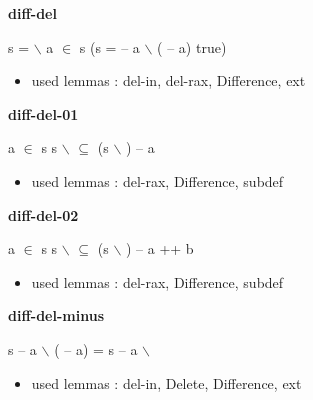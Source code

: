 \documentclass[a4paper]{article}
\begin{document}
{\large\bf diff-del}

\medskip

 \Fol s =  $\backslash$  \And \Not a $\in$ s \Imp (s =  -- a $\backslash$ ( -- a) \Equiv true)

\begin{itemize}


\item       used lemmas  : del-in, del-rax, Difference, ext

\end{itemize}

\medskip

\bigskip

{\large\bf diff-del-01}

\medskip

 \Fol \Not a $\in$ s \Imp s $\backslash$  $\subseteq$ (s $\backslash$ ) -- a

\begin{itemize}


\item       used lemmas  : del-rax, Difference, subdef

\end{itemize}

\medskip

\bigskip

{\large\bf diff-del-02}

\medskip

 \Fol \Not a $\in$ s \Imp s $\backslash$  $\subseteq$ (s $\backslash$ ) -- a ++ b

\begin{itemize}


\item       used lemmas  : del-rax, Difference, subdef

\end{itemize}

\medskip

\bigskip

{\large\bf diff-del-minus}

\medskip

 \Fol s -- a $\backslash$ ( -- a) = s -- a $\backslash$ 

\begin{itemize}


\item       used lemmas  : del-in, Delete, Difference, ext

\end{itemize}
\end{document}
